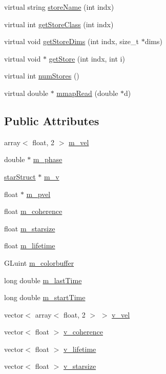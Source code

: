 \begin{DoxyCompactItemize}
virtual string \hyperlink{classStarField_a047f987e052fc14fd8041658c153e0f1}{store\-Name} (int indx)
\item 
virtual int \hyperlink{classStarField_a42fa7234a0bb1e7b2e1d734fb9ed2dae}{get\-Store\-Class} (int indx)
\item 
virtual void \hyperlink{classStarField_a1cf58acb059f13adcb4b989120f99db5}{get\-Store\-Dims} (int indx, size\-\_\-t $\ast$dims)
\item 
virtual void $\ast$ \hyperlink{classStarField_a3d33db9d5e4c05a11cbe0c11a3bae5ba}{get\-Store} (int indx, int i)
\item 
virtual int \hyperlink{classStarField_a1289224a6763a69ac041eb32d685b657}{num\-Stores} ()
\item 
virtual double $\ast$ \hyperlink{classStarField_a6937d614690f774772920ae9faee9bab}{mmap\-Read} (double $\ast$d)
\end{DoxyCompactItemize}
\subsection*{Public Attributes}
\begin{DoxyCompactItemize}
\item 
array$<$ float, 2 $>$ \hyperlink{classStarField_a21ba5382655395de9cce3328cf4be730}{m\-\_\-vel}
\item 
double $\ast$ \hyperlink{classStarField_a922034700e887585b42b80df399ddede}{m\-\_\-phase}
\item 
\hyperlink{structstarStruct}{star\-Struct} $\ast$ \hyperlink{classStarField_af6c1cf901231fd963efaa1c8ed1eca5d}{m\-\_\-v}
\item 
float $\ast$ \hyperlink{classStarField_a483be12bd49068c4f46a14dfc733a2ca}{m\-\_\-pvel}
\item 
float \hyperlink{classStarField_a65a4e5967dd2e328274d61cf8a5c50ba}{m\-\_\-coherence}
\item 
float \hyperlink{classStarField_adf36490fe3843a374b437b2fc1f482d6}{m\-\_\-starsize}
\item 
float \hyperlink{classStarField_a575970efe2365bb4dfa1b1b2eebafbd7}{m\-\_\-lifetime}
\item 
G\-Luint \hyperlink{classStarField_aa3e4c31177f3c5be4f11e629e4a1b5a6}{m\-\_\-colorbuffer}
\item 
long double \hyperlink{classStarField_a04bcafb900567a3b87f9c910614c8fa4}{m\-\_\-last\-Time}
\item 
long double \hyperlink{classStarField_a71f79afd2f64f68bae9edf978b579c5d}{m\-\_\-start\-Time}
\item 
vector$<$ array$<$ float, 2 $>$ $>$ \hyperlink{classStarField_a28482b3624fa5204a35faf1dbca6136c}{v\-\_\-vel}
\item 
vector$<$ float $>$ \hyperlink{classStarField_a9184ebba5f686d75ac8ee3c3da3b3f64}{v\-\_\-coherence}
\item 
vector$<$ float $>$ \hyperlink{classStarField_a3090733382397dd067da0f60d26085c0}{v\-\_\-lifetime}
\item 
vector$<$ float $>$ \hyperlink{classStarField_ac66cfbc7ac7d40cd1c7f0b7bf6b5dd1a}{v\-\_\-starsize}
\end{DoxyCompactItemize}


